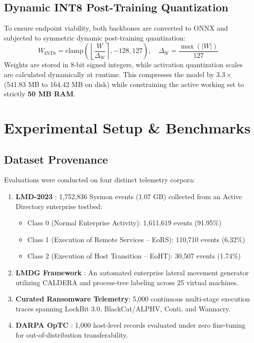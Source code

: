\documentclass[10pt,journal,compsoc]{IEEEtran}
\begin{document}
\subsection{Dynamic INT8 Post-Training Quantization}
To ensure endpoint viability, both backbones are converted to ONNX and subjected to symmetric dynamic post-training quantization:
\begin{equation}
    W_{\text{INT8}} = \text{clamp}\left( \left\lfloor \frac{W}{\Delta_W} \right\rceil, -128, 127 \right), \quad \Delta_W = \frac{\max(|W|)}{127}
\end{equation}
Weights are stored in 8-bit signed integers, while activation quantization scales are calculated dynamically at runtime. This compresses the model by $3.3\times$ (541.83 MB to 164.42 MB on disk) while constraining the active working set to strictly \textbf{50 MB RAM}.

\section{Experimental Setup \& Benchmarks}

\subsection{Dataset Provenance}
Evaluations were conducted on four distinct telemetry corpora:
\begin{enumerate}
    \item \textbf{LMD-2023} \cite{smiliotopoulos2023lmd}: 1,752,836 Sysmon events (1.07 GB) collected from an Active Directory enterprise testbed:
    \begin{itemize}
        \item Class 0 (Normal Enterprise Activity): 1,611,619 events (91.95\%)
        \item Class 1 (Execution of Remote Services -- EoRS): 110,710 events (6.32\%)
        \item Class 2 (Execution of Host Transition -- EoHT): 30,507 events (1.74\%)
    \end{itemize}
    \item \textbf{LMDG Framework} \cite{mabrouk2025lmdg}: An automated enterprise lateral movement generator utilizing CALDERA and process-tree labeling across 25 virtual machines.
    \item \textbf{Curated Ransomware Telemetry}: 5,000 continuous multi-stage execution traces spanning LockBit 3.0, BlackCat/ALPHV, Conti, and Wannacry.
    \item \textbf{DARPA OpTC} \cite{darpa2020optc}: 1,000 host-level records evaluated under zero fine-tuning for out-of-distribution transferability.
\end{enumerate}
\end{document}
